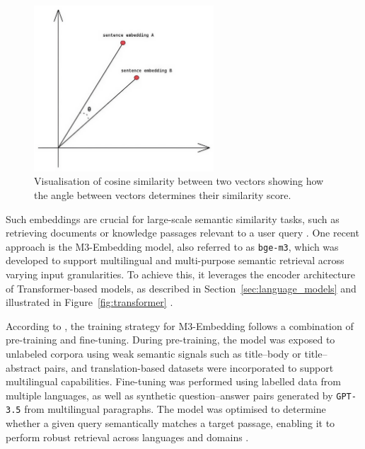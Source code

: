 \documentclass[a4paper,oneside,bibliography=totoc]{scrbook}
\begin{document}
\begin{figure}[t]
  \centering
  \includegraphics[width=0.6\textwidth]{figures/cosine_similarity.jpeg}
  \caption[Visualisation of cosine similarity between two vectors showing how the angle between vectors determines their similarity score]{Visualisation of cosine similarity between two vectors showing how the angle between vectors determines their similarity score. \cite{Leys2022}}
  \label{fig:cosine_similarity}
\end{figure}

Such embeddings are crucial for large-scale semantic similarity tasks, such as retrieving documents or knowledge passages relevant to a user query \cite{Reimers2019,Gao2024}. One recent approach is the M3-Embedding model, also referred to as \texttt{bge-m3}, which was developed to support multilingual and multi-purpose semantic retrieval across varying input granularities. To achieve this, it leverages the encoder architecture of Transformer-based models, as described in Section~\ref{sec:language_models} and illustrated in Figure~\ref{fig:transformer} \cite{Chen2024}.

According to \cite{Chen2024}, the training strategy for M3-Embedding follows a combination of pre-training and fine-tuning. During pre-training, the model was exposed to unlabeled corpora using weak semantic signals such as title–body or title–abstract pairs, and translation-based datasets were incorporated to support multilingual capabilities. Fine-tuning was performed using labelled data from multiple languages, as well as synthetic question–answer pairs generated by \texttt{GPT-3.5} from multilingual paragraphs. The model was optimised to determine whether a given query semantically matches a target passage, enabling it to perform robust retrieval across languages and domains \cite{Chen2024}.
\end{document}
